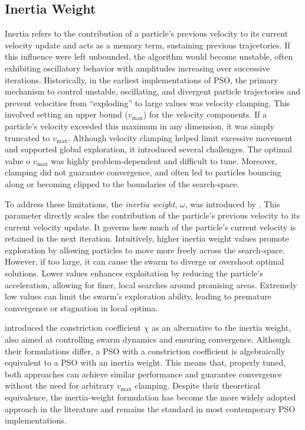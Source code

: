 {\subsection{Inertia Weight}

Inertia refers to the contribution of a particle's previous velocity to its current velocity update and acts as a memory term, sustaining previous trajcetories. If this influence were left unbounded, the algorithm would become unstable, often exhibiting oscillatory behavior with amplitudes increasing over successive iterations.
Historically, in the earliest implementations of PSO, the primary mechanism to control unstable, oscillating, and divergent particle trajectories and prevent velocities from ``exploding'' to large values was velocity clamping. This involved setting an upper bound ($v_{\text{max}}$) for the velocity components. If a particle's velocity exceeded this maximum in any dimension, it was simply truncated to $v_{\text{max}}$. Although velocity clamping helped limit excessive movement and supported global exploration, it introduced several challenges. The optimal value o $v_{\text{max}}$ was highly problem-dependent and difficult to tune. Moreover, clamping did not guarantee convergence, and often led to particles bouncing along or becoming clipped to the boundaries of the \gls{search-space}.

To address these limitations, the \textit{inertia weight}, $\omega$, was introduced by \citeauthor{shi1998modified} \parencite*{shi1998modified,shi1999empirical}. This parameter directly scales the contribution of the particle's previous velocity to its current velocity update. It governs how much of the particle's current velocity is retained in the next iteration. Intuitively, higher inertia weight values promote exploration by allowing particles to move more freely across the \gls{search-space}. However, if too large, it can cause the swarm to diverge or overshoot optimal solutions.
Lower values  enhances exploitation by reducing the particle's acceleration, allowing for finer, local searches around promising areas.  Extremely low values can limit the swarm's exploration ability, leading to premature convergence or stagnation in local optima.

\citet{clerc2002particle} introduced the constriction coefficient $\chi$ as an alternative to the inertia weight, also aimed at controlling swarm dynamics and ensuring convergence. Although their formulations differ, a PSO with a constriction coefficient is algebraically equivalent to a PSO with an inertia weight. This means that, properly tuned, both approaches can achieve similar performance and guarantee convergence without the need for arbitrary $v_{\text{max}}$ clamping. Despite their theoretical equivalence, the inertia-weight formulation has become the more widely adopted approach in the literature and remains the standard in most contemporary PSO implementations.

}
